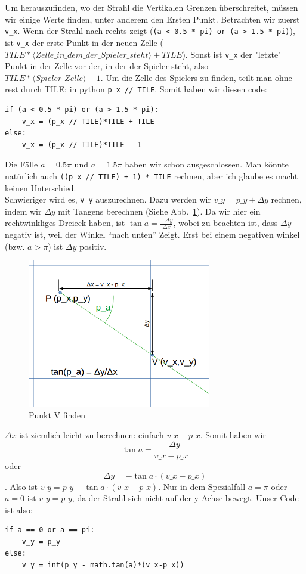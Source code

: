 \documentclass[a4paper,12pt]{report}
\begin{document}
Um herauszufinden, wo der Strahl die Vertikalen Grenzen überschreitet, müssen wir einige Werte finden, unter anderem den Ersten Punkt. Betrachten wir zuerst \texttt{v\_x}. Wenn der Strahl nach rechts zeigt (\texttt{(a < 0.5 * pi) or (a > 1.5 * pi)}), ist \texttt{v\_x} der erste Punkt in der neuen Zelle ($TILE*\langle Zelle\_in\_dem\_der\_Spieler\_steht\rangle + TILE$). Sonst ist \texttt{v\_x} der "letzte" Punkt in der Zelle vor der, in der der Spieler steht, also $TILE*\langle Spieler\_Zelle\rangle - 1$. Um die Zelle des Spielers zu finden, teilt man ohne rest durch TILE; in python \texttt{p\_x // TILE}. Somit haben wir diesen code:
\begin{Verbatim}[baselinestretch=1.0, xleftmargin=1cm]
if (a < 0.5 * pi) or (a > 1.5 * pi):
	v_x = (p_x // TILE)*TILE + TILE
else:
	v_x = (p_x // TILE)*TILE - 1
\end{Verbatim}

Die Fälle $a = 0.5\pi$ und $a = 1.5\pi$ haben wir schon ausgeschlossen. Man könnte natürlich auch \texttt{((p\_x // TILE) + 1) * TILE} rechnen, aber ich glaube es macht keinen Unterschied. \\

Schwieriger wird es, \texttt{v\_y} auszurechnen. Dazu werden wir $v\_y = p\_y + \Delta y$ rechnen, indem wir $\Delta y$ mit Tangens berechnen (Siehe Abb.~\ref{fig:vcheck1}). Da wir hier ein rechtwinkliges Dreieck haben, ist $\tan a = \frac{-\Delta y}{\Delta x}$, wobei zu beachten ist, dass $\Delta y$ negativ ist, weil der Winkel ``nach unten'' Zeigt.
Erst bei einem negativen winkel (bzw. $a > \pi$) ist $\Delta y$ positiv. \\
\begin{figure}[htbp] 
        \centering
        \includegraphics[width=8cm]{vcheck1.png} 
        \caption{Punkt V finden}
        \label{fig:vcheck1}
\end{figure}
$\Delta x$ ist ziemlich leicht zu berechnen: einfach $v\_x - p\_x$. Somit haben wir $$\tan a = \frac{-\Delta y}{v\_x - p\_x}$$ oder $$\Delta y = -\tan a \cdot (v\_x - p\_x)$$. Also ist $v\_y = p\_y - \tan a \cdot (v\_x - p\_x)$. Nur in dem Spezialfall $a = \pi$ oder $a = 0$ ist $v\_y = p\_y$, da der Strahl sich nicht auf der y-Achse bewegt. Unser Code ist also:
\begin{Verbatim}[baselinestretch=1.0, xleftmargin=1cm]
if a == 0 or a == pi:
	v_y = p_y
else:
	v_y = int(p_y - math.tan(a)*(v_x-p_x))
\end{Verbatim}
\end{document}
